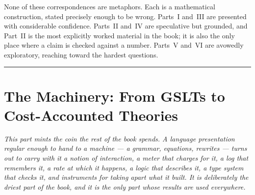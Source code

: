 \documentclass[12pt,openright,twoside]{book}
\theoremstyle{remark}
\theoremstyle{plain}
\theoremstyle{remark}
\theoremstyle{plain}
\theoremstyle{plain}
\begin{document}
None of these correspondences are metaphors.
Each is a mathematical construction, stated precisely enough to be wrong.
Parts~I and~III are presented with considerable confidence.
Parts~II and~IV are speculative but grounded, and Part~II is the most
explicitly worked material in the book; it is also the only place where a
claim is checked against a number.
Parts~V and~VI are avowedly exploratory, reaching toward the hardest
questions.

\bigskip
\noindent\hrule
\bigskip


\part{The Machinery: From GSLTs to Cost-Accounted Theories}
\label{part:machinery}

\vspace{1em}
\begin{mdframed}[backgroundcolor=remarkgray, linecolor=gray!60,
                 linewidth=1pt, topline=false, rightline=false,
                 bottomline=false]
\small\itshape
This part mints the coin the rest of the book spends.
A language presentation regular enough to hand to a machine --- a
grammar, equations, rewrites --- turns out to carry with it a notion of
interaction, a meter that charges for it, a log that remembers it, a
rate at which it happens, a logic that describes it, a type system that
checks it, and instruments for taking apart what it built.
It is deliberately the driest part of the book, and it is the only part
whose results are used everywhere.
\end{mdframed}

\bigskip

\end{document}
